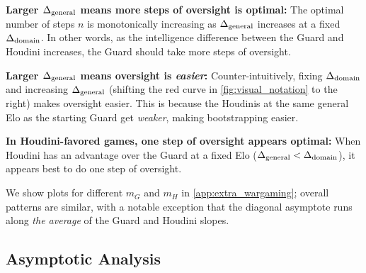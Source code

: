 \documentclass{article}
\begin{document}
\textbf{Larger $\Delta_{\rm general}$ means more steps of oversight is optimal:} The optimal number of steps $n$ is monotonically increasing as $\Delta_{\rm general}$ increases at a fixed $\Delta_{\rm domain}$. In other words, as the intelligence difference between the Guard and Houdini increases, the Guard should take more steps of oversight.

\textbf{Larger $\Delta_{\rm general}$ means oversight is \textit{easier}:} Counter-intuitively, fixing $\Delta_{\rm domain}$ and increasing $\Delta_{\rm general}$ (shifting the red curve in \cref{fig:visual_notation} to the right) makes oversight easier. This is because the Houdinis at the same general Elo as the starting Guard get \textit{weaker}, making bootstrapping easier.

\textbf{In Houdini-favored games, one step of oversight appears optimal:} When Houdini has an advantage over the Guard at a fixed Elo ($\Delta_{\rm general} < \Delta_{\rm domain}$), it appears best to do one step of oversight.





We show plots for different $m_G$ and $m_H$ in \cref{app:extra_wargaming}; overall patterns are similar, with a notable exception that the diagonal asymptote runs along \textit{the average} of the Guard and Houdini slopes.




\subsection{Asymptotic Analysis}
\label{sec:theoretical_results}
\end{document}
